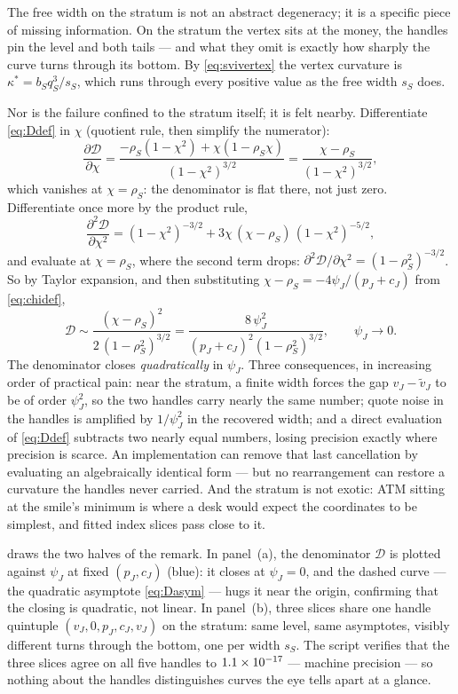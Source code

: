\begin{remark}
\label{rem:stratum}
The free width on the stratum is not an abstract degeneracy; it is a
specific piece of missing information.  On the stratum the vertex sits
at the money, the handles pin the level and both tails --- and what
they omit is exactly how sharply the curve turns through its bottom.
By \eqref{eq:svivertex} the vertex curvature is
$\kappa^*=b_Sq_S^3/s_S$, which runs through every positive value as the
free width $s_S$ does.

Nor is the failure confined to the stratum itself; it is felt nearby.
Differentiate \eqref{eq:Ddef} in $\chi$ (quotient rule, then simplify
the numerator):
\[
\frac{\partial\mathcal{D}}{\partial\chi}
=\frac{-\rho_S(1-\chi^2)+\chi(1-\rho_S\chi)}{(1-\chi^2)^{3/2}}
=\frac{\chi-\rho_S}{(1-\chi^2)^{3/2}},
\]
which vanishes at $\chi=\rho_S$: the denominator is flat there, not
just zero.  Differentiate once more by the product rule,
\[
\frac{\partial^2\mathcal{D}}{\partial\chi^2}
=(1-\chi^2)^{-3/2}+3\chi\,(\chi-\rho_S)\,(1-\chi^2)^{-5/2},
\]
and evaluate at $\chi=\rho_S$, where the second term drops:
$\partial^2\mathcal{D}/\partial\chi^2=(1-\rho_S^2)^{-3/2}$.  So by
Taylor expansion, and then substituting
$\chi-\rho_S=-4\psi_J/(p_J+c_J)$ from \eqref{eq:chidef},
\begin{equation}
\mathcal{D}
\sim\frac{(\chi-\rho_S)^2}{2\,(1-\rho_S^2)^{3/2}}
=\frac{8\,\psi_J^2}{(p_J+c_J)^2(1-\rho_S^2)^{3/2}},
\qquad\psi_J\to0.
\label{eq:Dasym}
\end{equation}
The denominator closes \emph{quadratically} in $\psi_J$.  Three
consequences, in increasing order of practical pain: near the stratum,
a finite width forces the gap $v_J-\tilde v_J$ to be of order
$\psi_J^2$, so the two handles carry nearly the same number; quote
noise in the handles is amplified by $1/\psi_J^2$ in the recovered
width; and a direct evaluation of \eqref{eq:Ddef} subtracts two nearly
equal numbers, losing precision exactly where precision is scarce.  An
implementation can remove that last cancellation by evaluating an
algebraically identical form --- but no rearrangement can restore a
curvature the handles never carried.  And the stratum is not exotic:
ATM sitting at the smile's minimum is where a desk would expect the
coordinates to be simplest, and fitted index slices pass close to it.
\end{remark}

 draws the two halves of the remark.  In
panel~(a), the denominator $\mathcal{D}$ is plotted against $\psi_J$ at
fixed $(p_J,c_J)$ (blue): it closes at $\psi_J=0$, and the dashed curve
--- the quadratic asymptote \eqref{eq:Dasym} --- hugs it near the
origin, confirming that the closing is quadratic, not linear.  In
panel~(b), three slices share one handle quintuple
$(v_J,0,p_J,c_J,v_J)$ on the stratum: same level, same asymptotes,
visibly different turns through the bottom, one per width $s_S$.  The
script verifies that the three slices agree on all five handles to
$1.1\times10^{-17}$ --- machine precision --- so nothing about the
handles distinguishes curves the eye tells apart at a glance.

